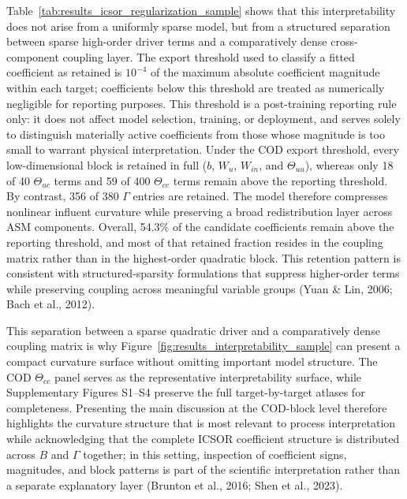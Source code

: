 \documentclass[a4paper,fleqn]{cas-sc}
\newcommand{\revitem}[2]{\textcolor{#1}{#2}}
\newenvironment{revblock}{\begingroup\color{revDefault}}{\endgroup}
\newenvironment{revblockr21}{\begingroup\color{revRtwoOne}}{\endgroup}
\begin{document}
\begin{revblock}
\begin{revblockr21}
Table~\ref{tab:results_icsor_regularization_sample} shows that this interpretability does not arise from a uniformly sparse model, but from a structured separation between sparse high-order driver terms and a comparatively dense cross-component coupling layer. \revitem{revRtwoOne}{The export threshold used to classify a fitted coefficient as retained is $10^{-4}$ of the maximum absolute coefficient magnitude within each target; coefficients below this threshold are treated as numerically negligible for reporting purposes. This threshold is a post-training reporting rule only: it does not affect model selection, training, or deployment, and serves solely to distinguish materially active coefficients from those whose magnitude is too small to warrant physical interpretation.} Under the COD export threshold, every low-dimensional block is retained in full ($b$, $W_u$, $W_{in}$, and $\Theta_{uu}$), whereas only 18 of 40 $\Theta_{uc}$ terms and 59 of 400 $\Theta_{cc}$ terms remain above the reporting threshold. By contrast, 356 of 380 $\Gamma$ entries are retained. The model therefore compresses nonlinear influent curvature while preserving a broad redistribution layer across ASM components. Overall, 54.3\% of the candidate coefficients remain above the reporting threshold, and most of that retained fraction resides in the coupling matrix rather than in the highest-order quadratic block. This retention pattern is consistent with structured-sparsity formulations that suppress higher-order terms while preserving coupling across meaningful variable groups (Yuan \& Lin, 2006; Bach et al., 2012).

This separation between a sparse quadratic driver and a comparatively dense coupling matrix is why Figure~\ref{fig:results_interpretability_sample} can present a compact curvature surface without omitting important model structure. The COD $\Theta_{cc}$ panel serves as the representative interpretability surface, while Supplementary Figures S1--S4 preserve the full target-by-target atlases for completeness. Presenting the main discussion at the COD-block level therefore highlights the curvature structure that is most relevant to process interpretation while acknowledging that the complete ICSOR coefficient structure is distributed across $B$ and $\Gamma$ together; in this setting, inspection of coefficient signs, magnitudes, and block patterns is part of the scientific interpretation rather than a separate explanatory layer (Brunton et al., 2016; Shen et al., 2023).


\end{revblockr21}
\end{revblock}
\end{document}
